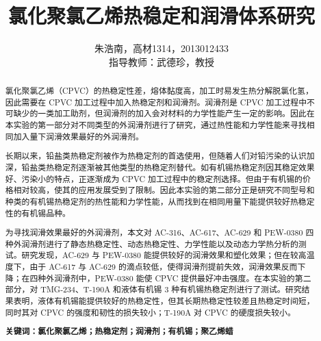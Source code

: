 \documentclass[a4paper, oneside, onecolumn, titlepage, 12pt]{ctexrep}    %
\title{\sanhao 氯化聚氯乙烯热稳定和润滑体系研究}
\author{
    \wuhao 朱浩南，高材1314，2013012433\\
    \wuhao 指导教师：武德珍，教授
}
\date{}
\newcommand{\xiaosihao}{\fontsize{12pt}{\baselineskip}\selectfont}  %
\begin{document}
\maketitle

\begin{abstract}\xiaosihao
    氯化聚氯乙烯（CPVC）的热稳定性差，熔体黏度高，加工时易发生热分解脱氯化氢，因此需要在 CPVC 加工过程中加入热稳定剂和润滑剂。润滑剂是 CPVC 加工过程中不可缺少的一类加工助剂，但润滑剂的加入会对材料的力学性能产生一定的影响。因此在本实验的第一部分对不同类型的外润滑剂进行了研究，通过热性能和力学性能来寻找相同加入量下润滑效果最好的外润滑剂。\par
    长期以来，铅盐类热稳定剂被作为热稳定剂的首选使用，但随着人们对铅污染的认识加深，铅盐类热稳定剂逐渐被其他类型的热稳定剂替代。如有机锡热稳定剂因其稳定效果好、污染小的特点，正逐渐成为 CPVC 加工过程中的稳定剂选择。但由于有机锡的价格相对较高，使其的应用发展受到了限制。因此本实验的第二部分正是研究不同型号和种类的有机锡热稳定剂的热性能和力学性能，从而找到在相同用量下能提供较好热稳定性的有机锡品种。\par
    为寻找润滑效果最好的外润滑剂，本文对 AC-316、AC-617、AC-629 和 PEW-0380 四种外润滑剂进行了静态热稳定性、动态热稳定性、力学性能以及动态力学热分析的测试。研究发现，AC-629 与 PEW-0380 能提供较好的润滑效果和塑化效果；但在较高温度下，由于 AC-617 与 AC-629 的滴点较低，使得润滑剂提前失效，润滑效果反而下降；在四种外润滑剂中，PEW-0380 能使 CPVC 提供最好冲击强度。在本实验的第二部分，对 TMG-234、T-190A 和液体有机锡 3 种有机锡热稳定剂进行了测试。研究结果表明，液体有机锡能提供较好的热稳定性，但其长期热稳定性较差且热稳定时间短，同时其对 CPVC 的强度和韧性的损失较小；T-190A 对 CPVC 的硬度损失较小。\par
    \textbf{关键词：氯化聚氯乙烯；热稳定剂；润滑剂；有机锡；聚乙烯蜡}
\end{abstract}
\end{document}
